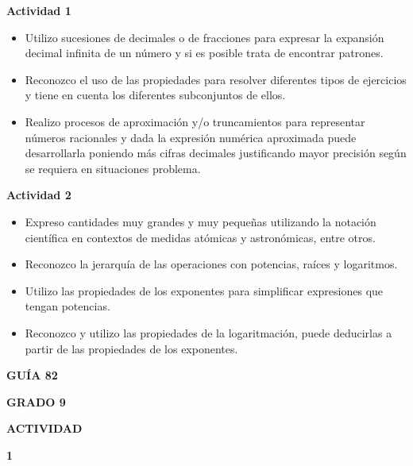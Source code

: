 \documentclass[12pt,a4paper]{article}
\begin{document}
\begin{tcolorbox}[colback=fondoverde,colframe=verdeclaro,title=\textbf{EVIDENCIAS DE APRENDIZAJE},fonttitle=\bfseries]

\textbf{Actividad 1}
\begin{itemize}
\item Utilizo sucesiones de decimales o de fracciones para expresar la expansión decimal infinita de un número y si es posible trata de encontrar patrones.
\item Reconozco el uso de las propiedades para resolver diferentes tipos de ejercicios y tiene en cuenta los diferentes subconjuntos de ellos.
\item Realizo procesos de aproximación y/o truncamientos para representar números racionales y dada la expresión numérica aproximada puede desarrollarla poniendo más cifras decimales justificando mayor precisión según se requiera en situaciones problema.
\end{itemize}

\textbf{Actividad 2}
\begin{itemize}
\item Expreso cantidades muy grandes y muy pequeñas utilizando la notación científica en contextos de medidas atómicas y astronómicas, entre otros.
\item Reconozco la jerarquía de las operaciones con potencias, raíces y logaritmos.
\item Utilizo las propiedades de los exponentes para simplificar expresiones que tengan potencias.
\item Reconozco y utilizo las propiedades de la logaritmación, puede deducirlas a partir de las propiedades de los exponentes.
\end{itemize}

\end{tcolorbox}


\begin{center}
\begin{tcolorbox}[colback=fondorosa,colframe=rojoclaro,width=4cm]
\centering
\textbf{GUÍA 82}

\textbf{GRADO 9}

\vspace{0.3cm}

\textbf{ACTIVIDAD}

{\Huge\textbf{1}}
\end{tcolorbox}
\end{center}
\end{document}
